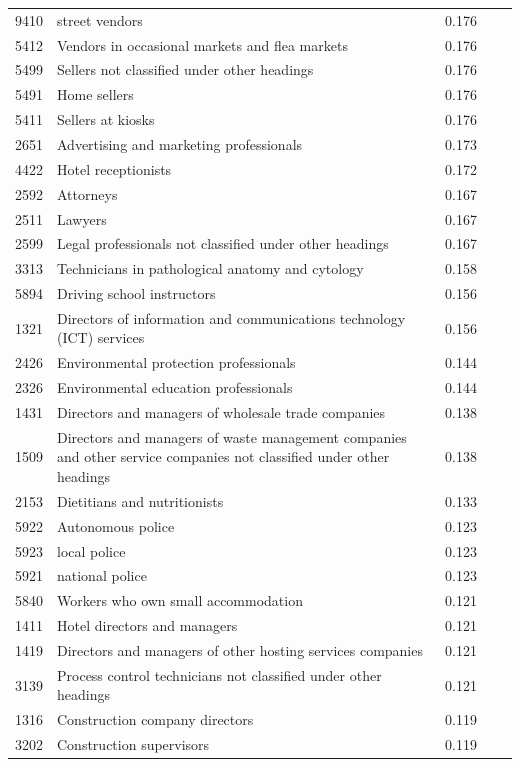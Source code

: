 \begin{longtable}{p{}>{\raggedright\arraybackslash}p{}rrr}
9410 & street vendors & 0.176 & & \\
5412 & Vendors in occasional markets and flea markets & 0.176 & & \\
5499 & Sellers not classified under other headings & 0.176 & & \\
5491 & Home sellers & 0.176 & & \\
5411 & Sellers at kiosks & 0.176 & & \\
2651 & Advertising and marketing professionals & 0.173 & & \\
4422 & Hotel receptionists & 0.172 & & \\
2592 & Attorneys & 0.167 & & \\
2511 & Lawyers & 0.167 & & \\
2599 & Legal professionals not classified under other headings & 0.167 & & \\
3313 & Technicians in pathological anatomy and cytology & 0.158 & & \\
5894 & Driving school instructors & 0.156 & & \\
1321 & Directors of information and communications technology (ICT) services & 0.156 & & \\
2426 & Environmental protection professionals & 0.144 & & \\
2326 & Environmental education professionals & 0.144 & & \\
1431 & Directors and managers of wholesale trade companies & 0.138 & & \\
1509 & Directors and managers of waste management companies and other service companies not classified under other headings & 0.138 & & \\
2153 & Dietitians and nutritionists & 0.133 & & \\
5922 & Autonomous police & 0.123 & & \\
5923 & local police & 0.123 & & \\
5921 & national police & 0.123 & & \\
5840 & Workers who own small accommodation & 0.121 & & \\
1411 & Hotel directors and managers & 0.121 & & \\
1419 & Directors and managers of other hosting services companies & 0.121 & & \\
3139 & Process control technicians not classified under other headings & 0.121 & & \\
1316 & Construction company directors & 0.119 & & \\
3202 & Construction supervisors & 0.119 & & \\

\end{longtable}
